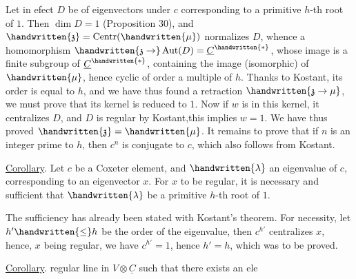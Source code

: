 Let in efect $D$ be  of eigenvectors under $c$ corresponding to a primitive $h$-th root of $1$. Then $\dim D=1$ (Proposition 30), and $\handwritten{\mathfrak{z}}=\operatorname{Centr}(\handwritten{\mu})$ normalizes $D$, whence a homomorphism $\handwritten{\mathfrak{z}\to}\operatorname{Aut}(D)=\underline{C}^{\handwritten{*}}$, whose image is a finite subgroup of $\underline{C}^{\handwritten{*}}$, containing the image (isomorphic) of $\handwritten{\mu}$, hence cyclic of order a multiple of $h$. Thanks to Kostant, its order is equal to $h$, and we have thus found a retraction $\handwritten{\mathfrak{z}\to\mu}$, we must prove that its kernel is reduced to $1$. Now if $w$ is in this kernel, it  centralizes $D$, and  $D$ is regular by Kostant,this implies $w=1$. We have thus proved $\handwritten{\mathfrak{z}}=\handwritten{\mu}$. It remains to prove that if $n$ is an integer prime to $h$, then $c^n$ is conjugate to $c$, which also follows from Kostant.

\uline{Corollary}. Let $c$ be a Coxeter element, and $\handwritten{\lambda}$ an eigenvalue of $c$, corresponding to an eigenvector $x$. For $x$ to be regular, it is necessary and sufficient that $\handwritten{\lambda}$ be a primitive $h$-th root of $1$.

The sufficiency has already been stated with Kostant's theorem. For necessity, let $h'\handwritten{\leq}h$ be the order of the eigenvalue, then $c^{h'}$ centralizes $x$, hence, $x$ being regular, we have $c^{h'}=1$, hence $h'=h$, which was to be proved.

\uline{Corollary}.   regular line in $V\otimes\underline{C}$ such that there exists an ele%
